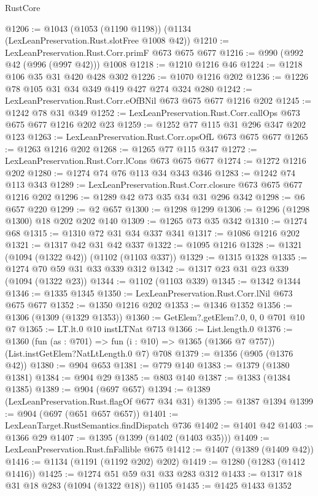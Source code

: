 \begin{lexlean}{RustCore}
\begin{coremodule}
{\begin{coremodule}
{{{{{{{{{@1206 := @1043 (@1053 (@1190 @1198)) (@1134 (LexLeanPreservation.Rust.slotFree @1008 @42))
@1210 := LexLeanPreservation.Rust.Corr.primF @673 @675 @677
@1216 := @990 (@992 @42 (@996 (@997 @42))) @1008
@1218 := @1210 @1216 @46
@1224 := @1218 @106 @35 @31 @420 @428 @302
@1226 := @1070 @1216 @202
@1236 := @1226 @78 @105 @31 @34 @349 @419 @427 @274 @324 @280
@1242 := LexLeanPreservation.Rust.Corr.eOfBNil @673 @675 @677 @1216 @202
@1245 := @1242 @78 @31 @349
@1252 := LexLeanPreservation.Rust.Corr.callOps @673 @675 @677 @1216 @202 @23
@1259 := @1252 @77 @115 @31 @296 @347 @202 @123
@1263 := LexLeanPreservation.Rust.Corr.opsOfL @673 @675 @677
@1265 := @1263 @1216 @202
@1268 := @1265 @77 @115 @347
@1272 := LexLeanPreservation.Rust.Corr.lCons @673 @675 @677
@1274 := @1272 @1216 @202
@1280 := @1274 @74 @76 @113 @34 @343 @346
@1283 := @1242 @74 @113 @343
@1289 := LexLeanPreservation.Rust.Corr.closure @673 @675 @677 @1216 @202
@1296 := @1289 @42 @73 @35 @34 @31 @296 @342
@1298 := @6 @657 @220
@1299 := @2 @657
@1300 := @1298 @1299
@1306 := @1296 (@1298 @1300) @18 @202 @202 @140
@1309 := @1265 @73 @35 @342
@1310 := @1274 @68
@1315 := @1310 @72 @31 @34 @337 @341
@1317 := @1086 @1216 @202
@1321 := @1317 @42 @31 @42 @337
@1322 := @1095 @1216
@1328 := @1321 (@1094 (@1322 @42)) (@1102 (@1103 @337))
@1329 := @1315 @1328
@1335 := @1274 @70 @59 @31 @33 @339 @312
@1342 := @1317 @23 @31 @23 @339 (@1094 (@1322 @23))
@1344 := @1102 (@1103 @339)
@1345 := @1342 @1344
@1346 := @1335 @1345
@1350 := LexLeanPreservation.Rust.Corr.lNil @673 @675 @677
@1352 := @1350 @1216 @202
@1353 := @1346 @1352
@1356 := @1306 (@1309 (@1329 @1353))
@1360 := GetElem?.getElem?.{0, 0, 0} @701 @10 @7
@1365 := LT.lt.{0} @10 instLTNat @713
@1366 := List.length.{0}
@1376 := @1360
    (fun (as : @701) => fun (i : @10) => @1365 (@1366 @7 @757))
    (List.instGetElem?NatLtLength.{0} @7)
    @708
@1379 := @1356 (@905 (@1376 @42))
@1380 := @904 @653
@1381 := @779 @140
@1383 := @1379 (@1380 @1381)
@1384 := @904 @29
@1385 := @803 @140
@1387 := @1383 (@1384 @1385)
@1389 := @904 (@697 @657)
@1394 := @1389 (LexLeanPreservation.Rust.flagOf @677 @34 @31)
@1395 := @1387 @1394
@1399 := @904 (@697 (@651 @657 @657))
@1401 := LexLeanTarget.RustSemantics.findDispatch @736
@1402 := @1401 @42
@1403 := @1366 @29
@1407 := @1395 (@1399 (@1402 (@1403 @35)))
@1409 := LexLeanPreservation.Rust.fnFallible @675
@1412 := @1407 (@1389 (@1409 @42))
@1416 := @1134 (@1191 (@1192 @202) @202)
@1419 := @1280 (@1283 (@1412 @1416))
@1425 := @1274 @51 @59 @31 @33 @283 @312
@1433 := @1317 @18 @31 @18 @283 (@1094 (@1322 @18)) @1105
@1435 := @1425 @1433 @1352
}}}}}}}}}
\end{coremodule}}
\end{coremodule}
\end{lexlean}
